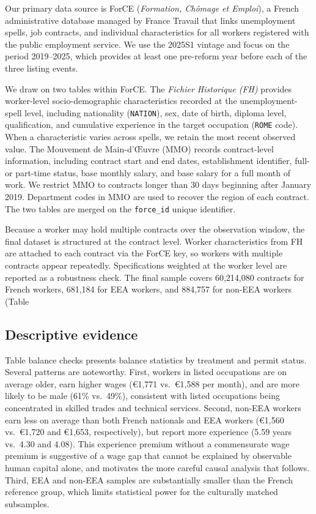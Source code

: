\documentclass[9pt]{article}
\begin{document}
Our primary data source is ForCE (\textit{Formation, Chômage et Emploi}),
a French administrative database managed by France Travail that links unemployment
spells, job contracts, and individual characteristics for all workers registered with
the public employment service. We use the 2025S1 vintage and focus on the period
2019--2025, which provides at least one pre-reform year before each of the three
listing events.

We draw on two tables within ForCE. The \textit{Fichier Historique (FH)} provides
worker-level socio-demographic characteristics recorded at the unemployment-spell
level, including nationality (\texttt{NATION}), sex, date of birth, diploma level,
qualification, and cumulative experience in the target occupation (\texttt{ROME} code).
When a characteristic varies across spells, we retain the most recent observed value.
The Mouvement de Main-d'{\OE}uvre (MMO) records contract-level information,
including contract start and end dates, establishment identifier, full- or part-time
status, base monthly salary, and base salary for a full month of work. We restrict
MMO to contracts longer than 30 days beginning after January 2019. Department codes
in MMO are used to recover the region of each contract. The two tables are merged on
the \texttt{force\_id} unique identifier.

Because a worker may hold multiple contracts over the observation window, the final
dataset is structured at the contract level. Worker characteristics from FH
are attached to each contract via the ForCE key, so workers with multiple contracts
appear repeatedly. Specifications weighted at the worker level are reported as a
robustness check. The final sample covers 60,214,080 contracts for French workers,
681,184 for EEA workers, and 884,757 for non-EEA workers (Table %

\subsection{Descriptive evidence}

Table balance checks presents balance statistics by treatment and permit status.
Several patterns are noteworthy. First, workers in listed occupations are on average
older, earn higher wages (€1,771 vs.\ €1,588 per month), and are more likely to be
male (61\% vs.\ 49\%), consistent with listed occupations being concentrated in
skilled trades and technical services. Second, non-EEA workers earn less on average
than both French nationals and EEA workers (€1,560 vs.\ €1,720 and €1,653,
respectively), but report more experience (5.59 years vs.\ 4.30 and 4.08). This
experience premium without a commensurate wage premium is suggestive of a wage gap
that cannot be explained by observable human capital alone, and motivates the more
careful causal analysis that follows. Third, EEA and non-EEA samples are
substantially smaller than the French reference group, which limits statistical power
for the culturally matched subsamples.
\end{document}
